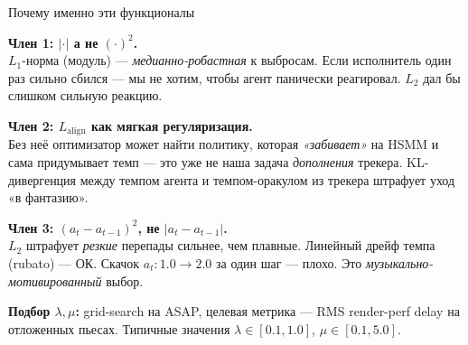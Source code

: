 \begin{frame}{Почему именно эти функционалы}

\textbf{Член 1: $|\cdot|$ а не $(\cdot)^2$.}\\
$L_1$-норма (модуль) --- \emph{медианно-робастная} к выбросам. Если
исполнитель один раз сильно сбился --- мы не хотим, чтобы агент
панически реагировал. $L_2$ дал бы слишком сильную реакцию.

\bigskip

\textbf{Член 2: $L_{\mathrm{align}}$ как мягкая регуляризация.}\\
Без неё оптимизатор может найти политику, которая \emph{«забивает»} на
HSMM и сама придумывает темп --- это уже не наша задача
\emph{дополнения} трекера. KL-дивергенция между темпом агента и
темпом-оракулом из трекера штрафует уход «в фантазию».

\bigskip

\textbf{Член 3: $(a_t - a_{t-1})^2$, не $|a_t - a_{t-1}|$.}\\
$L_2$ штрафует \emph{резкие} перепады сильнее, чем плавные. Линейный
дрейф темпа (rubato) --- ОК. Скачок $a_t: 1.0 \to 2.0$ за один шаг ---
плохо. Это \emph{музыкально-мотивированный} выбор.

\bigskip

\textbf{Подбор $\lambda, \mu$:} grid-search на ASAP, целевая метрика
--- RMS render-perf delay на отложенных пьесах. Типичные значения
$\lambda \in [0.1, 1.0]$, $\mu \in [0.1, 5.0]$.

\end{frame}
